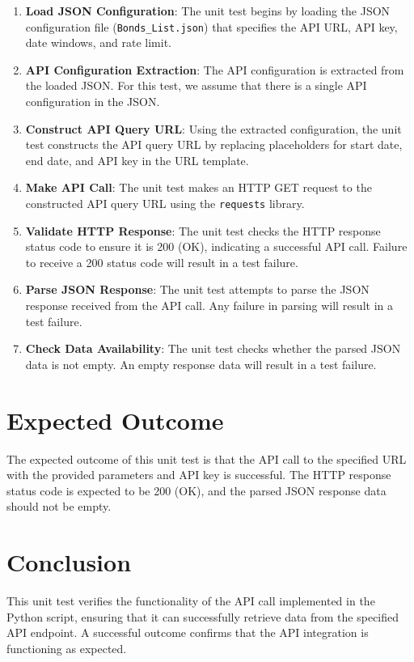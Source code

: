 \documentclass{article}
\begin{document}
\begin{enumerate}
  \item \textbf{Load JSON Configuration}: The unit test begins by loading the JSON configuration file (\texttt{Bonds\_List.json}) that specifies the API URL, API key, date windows, and rate limit.

  \item \textbf{API Configuration Extraction}: The API configuration is extracted from the loaded JSON. For this test, we assume that there is a single API configuration in the JSON.

  \item \textbf{Construct API Query URL}: Using the extracted configuration, the unit test constructs the API query URL by replacing placeholders for start date, end date, and API key in the URL template.

  \item \textbf{Make API Call}: The unit test makes an HTTP GET request to the constructed API query URL using the \texttt{requests} library.

  \item \textbf{Validate HTTP Response}: The unit test checks the HTTP response status code to ensure it is 200 (OK), indicating a successful API call. Failure to receive a 200 status code will result in a test failure.

  \item \textbf{Parse JSON Response}: The unit test attempts to parse the JSON response received from the API call. Any failure in parsing will result in a test failure.

  \item \textbf{Check Data Availability}: The unit test checks whether the parsed JSON data is not empty. An empty response data will result in a test failure.

\end{enumerate}

\section{Expected Outcome}
The expected outcome of this unit test is that the API call to the specified URL with the provided parameters and API key is successful. The HTTP response status code is expected to be 200 (OK), and the parsed JSON response data should not be empty.

\section{Conclusion}
This unit test verifies the functionality of the API call implemented in the Python script, ensuring that it can successfully retrieve data from the specified API endpoint. A successful outcome confirms that the API integration is functioning as expected.
\end{document}
